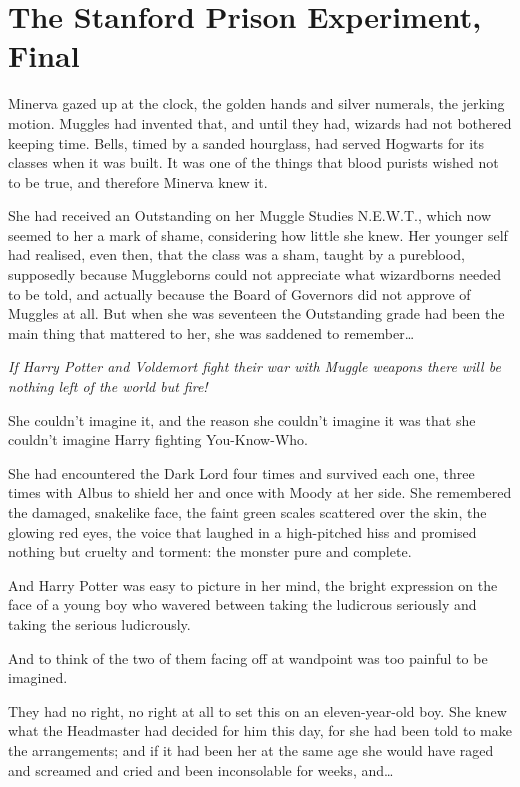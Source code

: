 \chapter{The Stanford Prison Experiment, Final}

Minerva gazed up at the clock, the golden hands and silver numerals, the
jerking motion. Muggles had invented that, and until they had, wizards
had not bothered keeping time. Bells, timed by a sanded hourglass, had
served Hogwarts for its classes when it was built. It was one of the
things that blood purists wished not to be true, and therefore Minerva
knew it.

She had received an Outstanding on her Muggle Studies N.E.W.T., which
now seemed to her a mark of shame, considering how little she knew. Her
younger self had realised, even then, that the class was a sham, taught
by a pureblood, supposedly because Muggleborns could not appreciate what
wizardborns needed to be told, and actually because the Board of
Governors did not approve of Muggles at all. But when she was seventeen
the Outstanding grade had been the main thing that mattered to her, she
was saddened to remember\ldots{}

\emph{If Harry Potter and Voldemort fight their war with Muggle weapons
there will be nothing left of the world but fire!}

She couldn't imagine it, and the reason she couldn't imagine it was that
she couldn't imagine Harry fighting You-Know-Who.

She had encountered the Dark Lord four times and survived each one,
three times with Albus to shield her and once with Moody at her side.
She remembered the damaged, snakelike face, the faint green scales
scattered over the skin, the glowing red eyes, the voice that laughed in
a high-pitched hiss and promised nothing but cruelty and torment: the
monster pure and complete.

And Harry Potter was easy to picture in her mind, the bright expression
on the face of a young boy who wavered between taking the ludicrous
seriously and taking the serious ludicrously.

And to think of the two of them facing off at wandpoint was too painful
to be imagined.

They had no right, no right at all to set this on an eleven-year-old
boy. She knew what the Headmaster had decided for him this day, for she
had been told to make the arrangements; and if it had been her at the
same age she would have raged and screamed and cried and been
inconsolable for weeks, and\ldots{}

